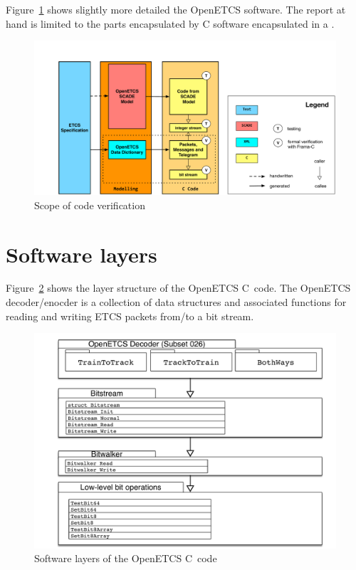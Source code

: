 Figure~\ref{fig:scope-of-code-verification} shows slightly more detailed
the OpenETCS software.
The report at hand is limited to the parts encapsulated by C software encapsulated 
in a .

\clearpage

\begin{figure}[hbt]
\begin{center}
\includegraphics[width=0.95\textheight,angle=90]{figures/OpenETCS-Stack.pdf}
\caption{\label{fig:scope-of-code-verification} Scope of code verification}
\end{center}
\end{figure}

\FloatBarrier

\section{Software layers}

Figure~\ref{fig:software-layers} shows the layer structure of the OpenETCS C~code.
The OpenETCS decoder\slash enocder is a collection of data structures and associated functions
for reading and writing ETCS packets from\slash to a bit stream.

\begin{figure}[hbt]
\begin{center}
\includegraphics[width=1.0\textwidth]{figures/software-layers.pdf}
\caption{\label{fig:software-layers} Software layers of the OpenETCS C~code}
\end{center}
\end{figure}

